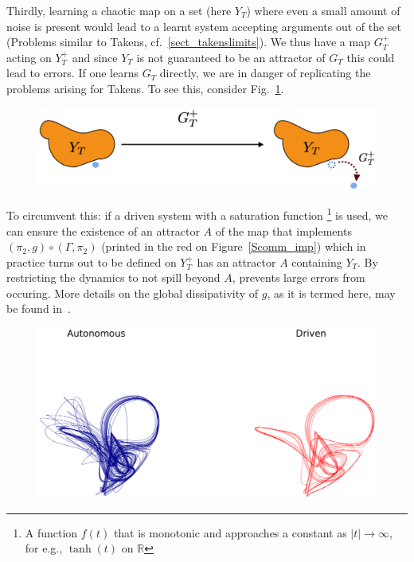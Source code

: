 
Thirdly, learning a chaotic map on a set (here $Y_T$) where even a small amount of noise is present would lead to a learnt system accepting arguments out of the set (Problems similar to Takens, cf.~\ref{sect_takenslimits}). 
We thus have a map $G_T^+$ acting on $Y_T^+$ and since $Y_T$ is not guaranteed to be an attractor of $G_T$ this could lead to errors.
If one learns $G_T$ directly, we are in danger of replicating the problems arising for Takens.  To see this, consider Fig.~\ref{fig:YtGtFailure}.

\begin{figure}[ht]
  \includegraphics[width=0.6\linewidth]{Graphs/_YTerrors.eps}
  \centering
\label{fig:YtGtFailure}
\end{figure}

To circumvent this: if a driven system with a saturation function \footnote{A function $f(t)$ that is monotonic and approaches a constant as $|t|\to \infty$, for e.g., $\tanh(t)$ on $\mathbb{R}$} is used, we can ensure the existence of an attractor $A$ of the map that implements 
$(\pi_2,g) \circ (\Gamma,\pi_2)$ (printed in the red on Figure~\ref{Scomm_imp})
 which in practice turns out to be defined on $Y_T^+$ has an attractor $A$  containing $Y_T$.
By restricting the dynamics to not spill beyond $A$, prevents large errors from occuring.  
More details on the global dissipativity of $g$, as it is termed here, may be found in~\cite{Supp}.
\begin{figure}[ht]
  \includegraphics[scale=0.25]{Graphs/_autovsdriven.eps}
  \centering
 \label{fig:learningFailure}
\end{figure}

